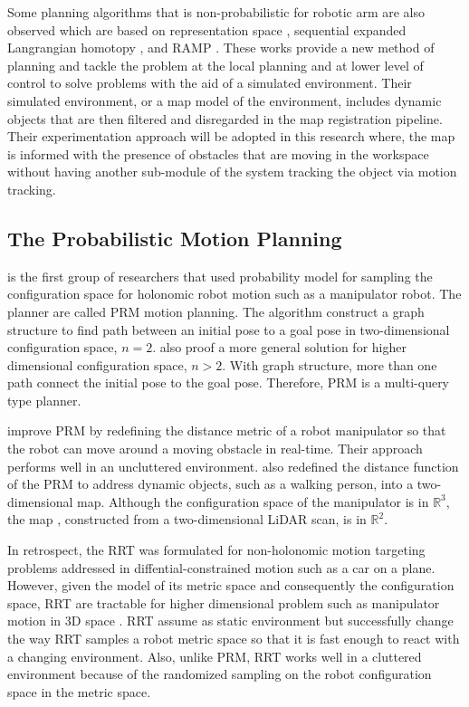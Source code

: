 Some planning algorithms that is non-probabilistic 
for robotic arm 
are also observed which are
based on 
representation space \parencite{Su2011,Liu2016a}, 
sequential expanded Langrangian homotopy \parencite{Dharmawan2018a}, and
\acrfull{RAMP} \parencite{Vannoy2008}. These 
works provide a new method of planning and tackle
the problem at the local planning and at lower level of control to 
solve problems with the aid of a simulated environment. 
Their simulated
environment, or a map model of the environment, includes dynamic objects
that are then filtered and disregarded in the map registration pipeline.
Their experimentation approach will be adopted in this 
research where, the map is informed
with the presence of obstacles that are moving in the workspace without
having another sub-module of the system tracking the object via 
motion tracking.


\subsection{The Probabilistic Motion Planning}
\textcite{Kavraki1996} is the first group of researchers 
that used probability model for sampling 
the configuration space for holonomic robot motion 
such as a manipulator robot. The planner are called 
\acrfull{PRM} motion planning. The algorithm
construct a graph structure 
to find path between an initial pose to a goal pose in
two-dimensional configuration space, $n=2$. \textcite{Kavraki1996} also
proof a more general solution for higher dimensional configuration space,
$n>2$. With graph structure,
more than one path connect the initial pose to the goal pose. Therefore, PRM is a 
multi-query type planner. 

\textcite{Kunz2010a} improve PRM by redefining the distance metric 
of a robot manipulator so that the robot can move
around a moving obstacle in real-time.
Their approach performs well in an uncluttered environment. 
\textcite{Kunz2010a} also redefined 
the distance function of the PRM to address dynamic objects, such as
a walking person, into a two-dimensional map. Although the 
configuration space of the manipulator is in $\mathbb{R}^3$, the map
, constructed from a two-dimensional \acrfull{LiDAR} scan, is in $\mathbb{R}^2$.

In retrospect, the RRT was formulated for 
non-holonomic motion \parencite{LaValle1998} targeting
problems addressed in diffential-constrained motion such
as a car on a plane. However, given the model of its metric space
and consequently the configuration space, RRT are tractable
for higher dimensional problem such as manipulator motion in 
3D space \parencite{Wei2018}. RRT assume as static
environment but \textcite{Wei2018} successfully 
change the way RRT samples a robot metric space so that
it is fast enough to react with a changing environment. Also, unlike PRM,
RRT works well in a cluttered environment because of 
the randomized sampling on the robot configuration space in 
the metric space. 

